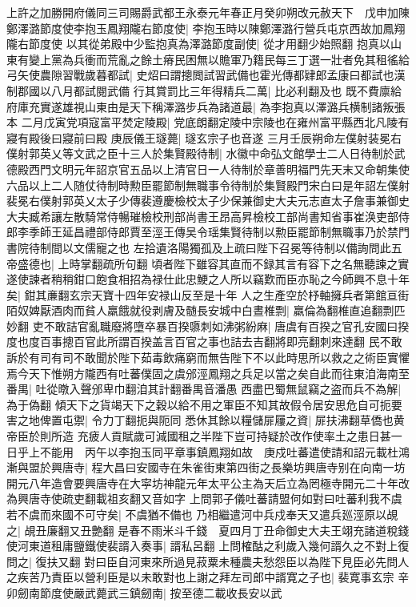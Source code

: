 上許之加勝開府儀同三司賜爵武都王永泰元年春正月癸卯朔改元赦天下　戊申加陳鄭澤潞節度使李抱玉鳳翔隴右節度使|{
	李抱玉時以陳鄭澤潞行營兵屯京西故加鳳翔隴右節度使}
以其從弟殿中少監抱真為澤潞節度副使|{
	從才用翻少始照翻}
抱真以山東有變上黨為兵衝而荒亂之餘土瘠民困無以贍軍乃籍民每三丁選一壯者免其租徭給弓矢使農隙習戰歲暮都試|{
	史炤曰謂摠閲試習武備也霍光傳都肄郎孟康曰都試也漢制郡國以八月都試閱武備}
行其賞罰比三年得精兵二萬|{
	比必利翻及也}
既不費廪給府庫充實遂雄視山東由是天下稱澤潞步兵為諸道最|{
	為李抱真以澤潞兵横制諸叛張本}
二月戊寅党項寇富平焚定陵殿|{
	党底朗翻定陵中宗陵也在雍州富平縣西北凡陵有寢有殿後曰寢前曰殿}
庚辰儀王璲薨|{
	璲玄宗子也音遂}
三月壬辰朔命左僕射装冕右僕射郭英乂等文武之臣十三人於集賢殿待制|{
	水徽中命弘文館學士二人日待制於武德殿西門文明元年詔京官五品以上清官日一人待制於章善明福門先天末又命朝集使六品以上二人随仗待制時勲臣罷節制無職事令待制於集賢殿門宋白曰是年詔左僕射裴冕右僕射郭英乂太子少傳裴遵慶檢校太子少保兼御史大夫元志直太子詹事兼御史大夫臧希讓左散騎常侍暢璀檢校刑部尚書王昂高昇檢校工部尚書知省事崔涣吏部侍郎李季師王延昌禮部侍郎賈至涇王傳吴令瑶集賢待制以勲臣罷節制無職事乃於禁門書院待制間以文儒寵之也}
左拾遺洛陽獨孤及上疏曰陛下召冕等待制以備詢問此五帝盛德也|{
	上時掌翻疏所句翻}
頃者陛下雖容其直而不録其言有容下之名無聽諫之實遂使諫者稍稍鉗口飽食相招為禄仕此忠鯁之人所以竊歎而臣亦恥之今師興不息十年矣|{
	鉗其亷翻玄宗天寶十四年安禄山反至是十年}
人之生產空於杼軸擁兵者第館亘街陌奴婢厭酒肉而貧人羸餓就役剥膚及髄長安城中白晝椎剽|{
	羸倫為翻椎直追翻剽匹妙翻}
吏不敢詰官亂職廢將墮卒暴百揆隳刺如沸粥紛麻|{
	唐虞有百揆之官孔安國曰揆度也度百事摠百官此所謂百揆盖言百官之事也詰去吉翻將即亮翻刺來達翻}
民不敢訴於有司有司不敢聞於陛下茹毒飲痛窮而無告陛下不以此時思所以救之之術臣實懼焉今天下惟朔方隴西有吐蕃僕固之虞邠涇鳳翔之兵足以當之矣自此而往東洎海南至番禺|{
	吐從暾入聲邠卑巾翻洎其計翻番禺音潘愚}
西盡巴蜀無鼠竊之盗而兵不為解|{
	為于偽翻}
傾天下之貨竭天下之穀以給不用之軍臣不知其故假令居安思危自可扼要害之地俾置屯禦|{
	令力丁翻扼與阨同}
悉休其餘以糧儲屝屨之資|{
	屝扶沸翻草僑也黄帝臣於則所造}
充疲人貢賦歲可減國租之半陛下豈可持疑於改作使率土之患日甚一日乎上不能用　丙午以李抱玉同平章事鎮鳳翔如故　庚戍吐蕃遣使請和詔元載杜鴻漸與盟於興唐寺|{
	程大昌曰安國寺在朱雀街東第四街之長樂坊興唐寺别在向南一坊開元八年造會要興唐寺在大寜坊神龍元年太平公主為天后立為罔極寺開元二十年改為興唐寺使疏吏翻載祖亥翻又音如字}
上問郭子儀吐蕃請盟何如對曰吐蕃利我不虞若不虞而來國不可守矣|{
	不虞猶不備也}
乃相繼遣河中兵戍奉天又遣兵廵涇原以覘之|{
	覘丑廉翻又丑艶翻}
是春不雨米斗千錢　夏四月丁丑命御史大夫王翊充諸道稅錢使河東道租庸鹽鐵使裴諝入奏事|{
	諝私呂翻}
上問榷酤之利歲入幾何諝久之不對上復問之|{
	復扶又翻}
對曰臣自河東來所過見菽粟未種農夫愁怨臣以為陛下見臣必先問人之疾苦乃責臣以營利臣是以未敢對也上謝之拜左司郎中諝寛之子也|{
	裴寛事玄宗}
辛卯劒南節度使嚴武薨武三鎮劒南|{
	按至德二載收長安以武}


